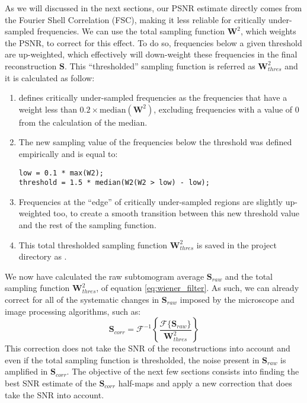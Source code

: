 As we will discussed in the next sections, our PSNR estimate directly comes from the Fourier Shell Correlation (FSC), making it less reliable for critically under-sampled frequencies. We can use the total sampling function $\bm{W}^2$, which weights the PSNR, to correct for this effect. To do so, frequencies below a given threshold are up-weighted, which effectively will down-weight these frequencies in the final reconstruction $\bm{S}$. This ``thresholded'' sampling function is referred as $\bm{W}_{thres}^2$ and it is calculated as follow:
\begin{enumerate}
    \item {\emClarity} defines critically under-sampled frequencies as the frequencies that have a weight less than $0.2 \times \mathrm{median}(\bm{W}^2)$, excluding frequencies with a value of 0 from the calculation of the median.
    \item The new sampling value of the frequencies below the threshold was defined empirically and is equal to:
\begin{lstlisting}
low = 0.1 * max(W2);
threshold = 1.5 * median(W2(W2 > low) - low);
\end{lstlisting}
    \item Frequencies at the ``edge'' of critically under-sampled regions are slightly up-weighted too, to create a smooth transition between this new threshold value and the rest of the sampling function.
    \item This total thresholded sampling function $\bm{W}_{thres}^2$ is saved in the project directory as .
\end{enumerate}

We now have calculated the raw subtomogram average $\bm{S}_{raw}$ and the total sampling function $\bm{W}_{thres}^2$, of equation \ref{eq:wiener_filter}. As such, we can already correct for all of the systematic changes in $\bm{S}_{raw}$ imposed by the microscope and image processing algorithms, such as:
\begin{equation}
    \bm{S}_{corr} = \mathcal{F}^{-1} \left\{ \frac{ \mathcal{F} \{ \bm{S}_{raw} \} }{ \bm{W}_{thres}^2 } \right\}
\end{equation}
This correction does not take the SNR of the reconstructions into account and even if the total sampling function is thresholded, the noise present in $\bm{S}_{raw}$ is amplified in $\bm{S}_{corr}$. The objective of the next few sections consists into finding the best SNR estimate of the $\bm{S}_{corr}$ half-maps and apply a new correction that does take the SNR into account.

